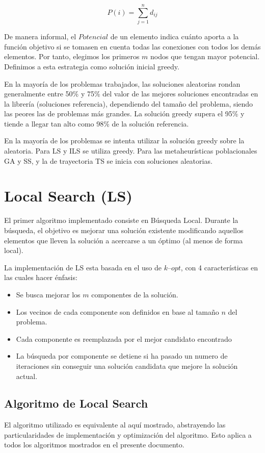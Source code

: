 \documentclass{ci5652}
\begin{document}
$$P(i)=\sum_{j=1}^{n}d_{ij}$$

De manera informal, el $Potencial$ de un elemento indica cuánto aporta a la función objetivo si se tomasen en cuenta todas las conexiones con todos los demás elementos. Por tanto, elegimos los primeros $m$ nodos que tengan mayor potencial. Definimos a esta estrategia como solución inicial greedy.

En la mayoría de los problemas trabajados, las soluciones aleatorias rondan generalmente entre 50\% y 75\% del valor de las mejores soluciones encontradas en la librería (soluciones referencia), dependiendo del tamaño del problema, siendo las peores las de problemas más grandes. La solución greedy supera el 95\% y tiende a llegar tan alto como 98\% de la solución referencia.

En la mayoría de los problemas se intenta utilizar la solución greedy sobre la aleatoria. Para LS y ILS se utiliza greedy. Para las metaheurísticas poblacionales GA y SS, y la de trayectoria TS  se inicia con soluciones aleatorias.

\section{Local Search (LS)}
El primer algoritmo implementado consiste en Búsqueda Local. Durante la búsqueda, el objetivo es mejorar una solución existente modificando aquellos elementos que lleven la solución a acercarse a un óptimo (al menos de forma local).

La implementación de LS esta basada en el uso de $k\text{--}opt$, con 4 características en las cuales hacer énfasis:
\begin{itemize} \itemsep5pt
	\item Se busca mejorar los $m$ componentes de la solución.
	\item Los vecinos de cada componente son definidos en base al tamaño $n$ del problema.
	\item Cada componente es reemplazada por el mejor candidato encontrado
	\item La búsqueda por componente se detiene si ha pasado un numero de iteraciones sin conseguir una solución candidata que mejore la solución actual.
\end{itemize}

\subsection{Algoritmo de Local Search}
El algoritmo utilizado es equivalente al aquí mostrado, abstrayendo las particularidades de implementación y optimización del algoritmo. Esto aplica a todos los algoritmos mostrados en el presente documento.
\end{document}
